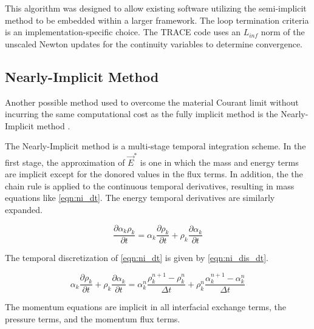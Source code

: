 This algorithm was designed to allow existing software utilizing the semi-implicit method to be embedded within a larger framework.
The loop termination criteria is an implementation-specific choice.
The TRACE code uses an $L_{inf}$ norm of the unscaled Newton updates for the continuity variables to determine convergence.

\subsection{Nearly-Implicit Method}
\label{subsect:numerics_nearly_implicit}
Another possible method used to overcome the material Courant limit without incurring the same computational cost as the fully implicit method is the Nearly-Implicit method \cite{Trapp1986, RELAP}.

The Nearly-Implicit method is a multi-stage temporal integration scheme.
In the first stage, the approximation  of $\vec{E}^{*}$ is one in which the mass and energy terms are implicit except for the donored values in the flux terms. 
In addition, the the chain rule is applied to the continuous temporal derivatives, resulting in mass equations like \eqref{eqn:ni_dt}.
The energy temporal derivatives are similarly expanded.

\begin{equation}
\label{eqn:ni_dt}
\frac{\partial \alpha_k \rho_k}{\partial t} = \alpha_k \frac{\partial \rho_k}{\partial t} + \rho_k \frac{\partial \alpha_k}{\partial t}
\end{equation}

The temporal discretization of \eqref{eqn:ni_dt} is given by \eqref{eqn:ni_dis_dt}.

\begin{equation}
\label{eqn:ni_dis_dt}
\alpha_k \frac{\partial \rho_k}{\partial t} + \rho_k \frac{\partial \alpha_k}{\partial t} = \alpha^n_k\frac{ \rho^{n+1}_k - \rho^{n}_k}{\Delta t} + \rho^{n}_k\frac{\alpha^{n+1}_k - \alpha^{n}_k}{\Delta t}
\end{equation}

The momentum equations are implicit in all interfacial exchange terms, the pressure terms, and the momentum flux terms.

